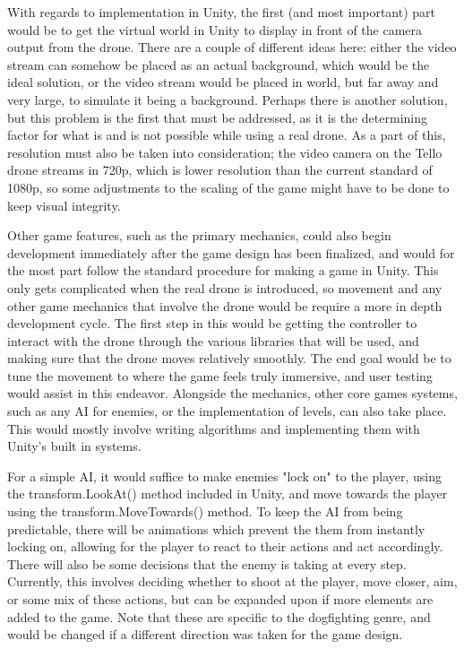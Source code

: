 \documentclass[10pt,twocolumn]{article}
\begin{document}
With regards to implementation in Unity, the first (and most important) part would be to get the virtual world in Unity to display in front of the camera output from the drone. There are a couple of different ideas here: either the video stream can somehow be placed as an actual background, which would be the ideal solution, or the video stream would be placed in world, but far away and very large, to simulate it being a background. Perhaps there is another solution, but this problem is the first that must be addressed, as it is the determining factor for what is and is not possible while using a real drone. As a part of this, resolution must also be taken into consideration; the video camera on the Tello drone streams in 720p, which is lower resolution than the current standard of 1080p, so some adjustments to the scaling of the game might have to be done to keep visual integrity.

Other game features, such as the primary mechanics, could also begin development immediately after the game design has been finalized, and would for the most part follow the standard procedure for making a game in Unity. This only gets complicated when the real drone is introduced, so movement and any other game mechanics that involve the drone would be require a more in depth development cycle. The first step in this would be getting the controller to interact with the drone through the various libraries that will be used, and making sure that the drone moves relatively smoothly. The end goal would be to tune the movement to where the game feels truly immersive, and user testing would assist in this endeavor. Alongside the mechanics, other core games systems, such as any AI for enemies, or the implementation of levels, can also take place. This would mostly involve writing algorithms and implementing them with Unity's built in systems. 

For a simple AI, it would suffice to make enemies "lock on" to the player, using the transform.LookAt() method included in Unity, and move towards the player using the transform.MoveTowards() method. To keep the AI from being predictable, there will be animations which prevent the them from instantly locking on, allowing for the player to react to their actions and act accordingly. There will also be some decisions that the enemy is taking at every step. Currently, this involves deciding whether to shoot at the player, move closer, aim, or some mix of these actions, but can be expanded upon if more elements are added to the game. Note that these are specific to the dogfighting genre, and would be changed if a different direction was taken for the game design. 
\end{document}
